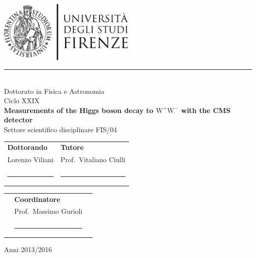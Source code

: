 \pagestyle{empty}

\begin{titlepage}
  \begin{center}
    \includegraphics[width=0.5\textwidth]{images/logo_unifi.jpg}\\
    \rule{15cm}{0.2mm}\\
     \vspace*{1cm}
    {\large 
      Dottorato in Fisica e Astronomia\\[0.5\baselineskip]
      Ciclo XXIX
    } \\
    \vspace*{1.cm}
    \vfill
    {\Huge {\bfseries Measurements of the Higgs boson decay to \boldmath$\mathrm{W^+ W^-}$ with the CMS detector}} \\
    \vspace*{1cm}
    {Settore scientifico disciplinare FIS/04 } \\
  \end{center}
  \vspace*{2cm}
  \begin{tabular}{p{} p{}}
    {\large \bfseries Dottorando} &    {\large \bfseries Tutore}\\
    {\large Lorenzo Viliani} &    {\large{Prof.~Vitaliano Ciulli}}\\
     & \\
    \rule{5cm}{0.2mm} & \rule{5cm}{0.2mm}\\
  \end{tabular}
  \vfill
  \begin{center}
  \begin{tabular}{p{} p{} p{} }
    &{\large \bfseries Coordinatore}&\\ 
    &{\large Prof.~Massimo Gurioli}&\\
    & & \\
    &\rule{5cm}{0.2mm}&\\
  \end{tabular}
  \vspace*{2.cm}
  
  {Anni 2013/2016}
  \end{center}
  
\end{titlepage}
